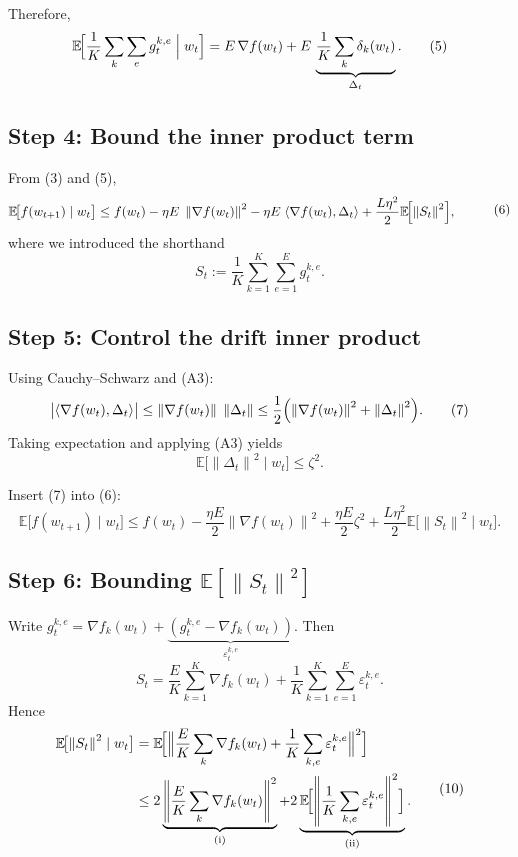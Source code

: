 \documentclass{article}
\newcommand{\EE}{\mathbb{E}}
\newcommand{\norm}[1]{\left\lVert#1\right\rVert}
\newcommand{\inner}[2]{\langle #1,#2\rangle}
\begin{document}
Therefore,
\[
\EE\!\Bigl[\frac1K\sum_{k}\sum_{e} g_{t}^{k,e}\Bigm| w_t\Bigr]
=E\,\nabla f(w_t)+E\,\underbrace{\frac1K\sum_{k}\delta_k(w_t)}_{\Delta_t}.
\tag{5}
\]

\subsection*{Step 4: Bound the inner product term}
From (3) and (5),
\[
\begin{aligned}
\EE\!\bigl[f(w_{t+1})\mid w_t\bigr]
&\le f(w_t)
-\eta E\;\norm{\nabla f(w_t)}^{2}
-\eta E\;\inner{\nabla f(w_t)}{\Delta_t}
+\frac{L\eta^{2}}{2}\EE\!\Bigl[\norm{S_{t}}^{2}\Bigr],
\end{aligned}
\tag{6}
\]
where we introduced the shorthand
\[
S_{t}:=\frac1K\sum_{k=1}^{K}\sum_{e=1}^{E} g_{t}^{k,e}.
\]

\subsection*{Step 5: Control the drift inner product}
Using Cauchy–Schwarz and (A3):
\[
\bigl|\inner{\nabla f(w_t)}{\Delta_t}\bigr|
\le \norm{\nabla f(w_t)}\;\norm{\Delta_t}
\le \frac12\Bigl(\norm{\nabla f(w_t)}^{2}+\norm{\Delta_t}^{2}\Bigr).
\tag{7}
\]
Taking expectation and applying (A3) yields
\[
\EE\!\bigl[\norm{\Delta_t}^{2}\mid w_t\bigr]\le \zeta^{2}.
\tag{8}
\]

Insert (7) into (6):
\[
\EE\!\bigl[f(w_{t+1})\mid w_t\bigr]
\le f(w_t)
-\frac{\eta E}{2}\norm{\nabla f(w_t)}^{2}
+\frac{\eta E}{2}\zeta^{2}
+\frac{L\eta^{2}}{2}\EE\!\bigl[\norm{S_{t}}^{2}\mid w_t\bigr].
\tag{9}
\]

\subsection*{Step 6: Bounding $\EE[\norm{S_{t}}^{2}]$}
Write $g_{t}^{k,e}= \nabla f_k(w_t)+\underbrace{(g_{t}^{k,e}-\nabla f_k(w_t))}_{\varepsilon_{t}^{k,e}}$.
Then
\[
S_t = \frac{E}{K}\sum_{k=1}^{K}\nabla f_k(w_t)+\frac1K\sum_{k=1}^{K}\sum_{e=1}^{E}\varepsilon_{t}^{k,e}.
\]
Hence
\[
\begin{aligned}
\EE\!\bigl[\norm{S_t}^{2}\mid w_t\bigr]
&= \EE\!\Bigl[\Bigl\| \frac{E}{K}\sum_{k}\nabla f_k(w_t)
          +\frac1K\sum_{k,e}\varepsilon_{t}^{k,e}\Bigr\|^{2}\Bigr] \\
&\le 2\underbrace{\norm{\frac{E}{K}\sum_{k}\nabla f_k(w_t)}^{2}}_{\text{(i)}}
   +2\underbrace{\EE\!\Bigl[\norm{\frac1K\sum_{k,e}\varepsilon_{t}^{k,e}}^{2}\Bigr]}_{\text{(ii)}} .
\end{aligned}
\tag{10}
\]
\end{document}
